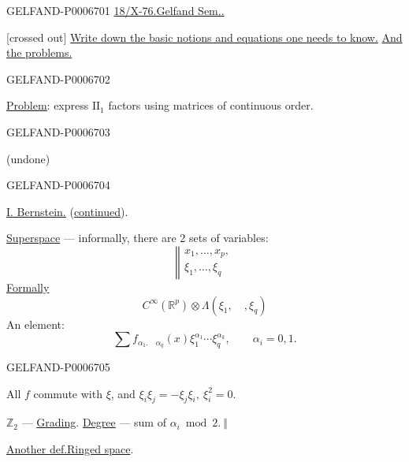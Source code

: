 \begin{GelfandAdjacentEvidence}{GELFAND-P000670}{1}
\underline{18/X-76.}\quad\underline{Gelfand Sem..}

[crossed out] \underline{Write down the basic notions and equations one needs to know.} \underline{And the problems.}
\end{GelfandAdjacentEvidence}
\begin{GelfandAdjacentEvidence}{GELFAND-P000670}{2}


\underline{\underline{Problem}}: express \(\mathrm{II}_1\) factors using matrices of continuous order.
\end{GelfandAdjacentEvidence}
\begin{GelfandAdjacentEvidence}{GELFAND-P000670}{3}


(undone)
\end{GelfandAdjacentEvidence}
\begin{GelfandAdjacentEvidence}{GELFAND-P000670}{4}


\underline{\underline{I. Bernstein.}} (\underline{continued}).

\underline{Superspace} --- informally, there are 2 sets of variables:
\[
\left\Vert\begin{array}{l}
x_1,\ldots,x_p,\\
\xi_1,\ldots,\xi_q
\end{array}\right.
\]
\underline{Formally}
\[
C^\infty(\mathbb R^p)\otimes\Lambda(\xi_1,\quad,\xi_q)
\]
An element:
\[
\sum f_{\alpha_1.\quad\alpha_q}(x)\xi_1^{\alpha_1}\cdots\xi_q^{\alpha_k},
\qquad \alpha_i=0,1.
\]
\end{GelfandAdjacentEvidence}
\begin{GelfandAdjacentEvidence}{GELFAND-P000670}{5}


All \(f\) commute with \(\xi\), and
\(\xi_i\xi_j=-\xi_j\xi_i,\ \xi_i^2=0\).

\(\mathbb Z_2\) --- \underline{Grading}.\qquad
\underline{Degree} --- sum of \(\alpha_i\bmod 2.\ \Vert\)

\underline{\underline{Another def.}} \underline{Ringed space}.
\end{GelfandAdjacentEvidence}
